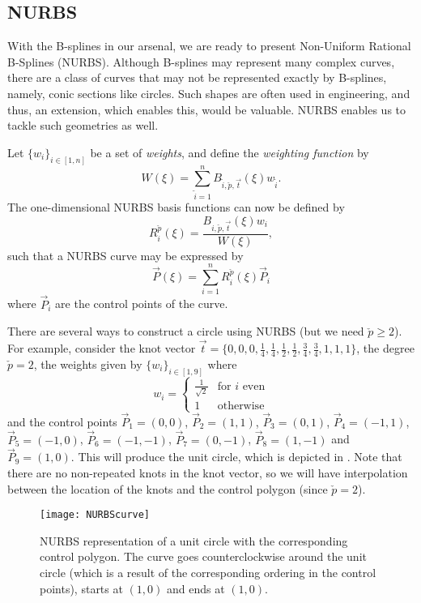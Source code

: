 \subsection{NURBS}
\renewcommand{\Xi}{{\vec{t}}}
With the B-splines in our arsenal, we are ready to present Non-Uniform Rational B-Splines (NURBS). Although B-splines may represent many complex curves, there are a class of curves that may not be represented exactly by B-splines, namely, conic sections like circles. Such shapes are often used in engineering, and thus, an extension, which enables this, would be valuable. NURBS enables us to tackle such geometries as well. 

Let $\{w_i\}_{i\in [1,n]}$ be a set of \textit{weights}, and define the \textit{weighting function} by
\begin{equation*}
	W(\xi) = \sum_{\tilde{i}=1}^{n} B_{\tilde{i},\check{p},\Xi}(\xi) w_{\tilde{i}}.
\end{equation*}
The one-dimensional NURBS basis functions can now be defined by
\begin{equation*}
	R_i^{\check{p}}(\xi) = \frac{B_{i,\check{p},\Xi}(\xi)w_i}{W(\xi)},
\end{equation*}
such that a NURBS curve may be expressed by
\begin{equation*}
	\vec{P}(\xi)=\sum_{i=1}^{n} R_i^{\check{p}}(\xi) \vec{P}_i
\end{equation*}
where $\vec{P}_i$ are the control points of the curve.

There are several ways to construct a circle using NURBS (but we need ${\check{p}\geq 2}$). For example, consider the knot vector $\Xi = \{0, 0, 0, \frac14, \frac14, \frac12, \frac12, \frac34, \frac34, 1, 1, 1\}$, the degree $\check{p}=2$, the weights given by $\{w_i\}_{i\in [1,9]}$ where
\begin{equation*}
	w_i = \begin{cases}
		\frac{1}{\sqrt{2}}& \text{for } i \text{ even}\\
		1& \text{otherwise}
	\end{cases}
\end{equation*}
and the control points $\vec{P}_1 = (0,0)$, $\vec{P}_2 = (1,1)$, $\vec{P}_3 = (0,1)$, $\vec{P}_4 = (-1,1)$, $\vec{P}_5 = (-1,0)$, $\vec{P}_6 = (-1,-1)$, $\vec{P}_7 = (0,-1)$, $\vec{P}_8 = (1,-1)$ and $\vec{P}_9 = (1,0)$. This will produce the unit circle, which is depicted in . Note that there are no non-repeated knots in the knot vector, so we will have interpolation between the location of the knots and the control polygon (since $\check{p} = 2$).
\begin{figure}
	\centering
	\texttt{[image: NURBScurve]} 
	\caption[NURBS representation of a unit circle]{NURBS representation of a unit circle with the corresponding control polygon. The curve goes counterclockwise around the unit circle (which is a result of the corresponding ordering in the control points), starts at $(1,0)$ and ends at $(1,0)$.}\label{Fig:NURBScurve}
\end{figure}

